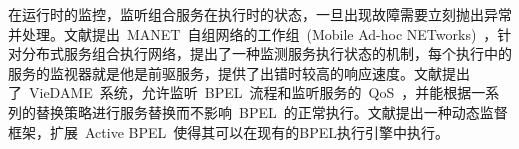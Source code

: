 在运行时的监控，监听组合服务在执行时的状态，一旦出现故障需要立刻抛出异常并处理。文献\cite{chen2008dynamic}提出~MANET~自组网络的工作组~(Mobile Ad-hoc NETworks)~，针对分布式服务组合执行网络，提出了一种监测服务执行状态的机制，每个执行中的服务的监视器就是他是前驱服务，提供了出错时较高的响应速度。文献\cite{moser2008non}提出了~VieDAME~系统，允许监听~BPEL~流程和监听服务的~QoS~，并能根据一系列的替换策略进行服务替换而不影响~BPEL~的正常执行。文献\cite{baresi2005dynamo}提出一种动态监督框架，扩展~Active BPEL~使得其可以在现有的BPEL执行引擎中执行。

%
%
%
%
%
